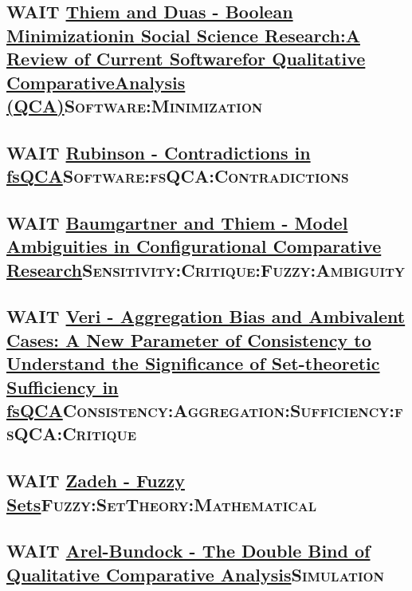 \documentclass[11pt]{article}
\begin{document}
\subsection*{{\bfseries\sffamily WAIT} \href{https://adriandusa.eu/files/2013-BMSSR.pdf}{Thiem and Duas - Boolean Minimizationin Social Science Research:A Review of Current Softwarefor Qualitative ComparativeAnalysis (QCA)}\hfill{}\textsc{Software:Minimization}}
\label{sec:org1ab0787}

\subsection*{{\bfseries\sffamily WAIT} \href{https://sci-hub.tw/https://doi.org/10.1007/s11135-012-9694-3}{Rubinson - Contradictions in fsQCA}\hfill{}\textsc{Software:fsQCA:Contradictions}}
\label{sec:org79c6c22}

\subsection*{{\bfseries\sffamily WAIT} \href{https://doi.org/10.1177\%2F0049124115610351}{Baumgartner and Thiem - Model Ambiguities in Configurational Comparative Research}\hfill{}\textsc{Sensitivity:Critique:Fuzzy:Ambiguity}}
\label{sec:org1ec85d5}

\subsection*{{\bfseries\sffamily WAIT} \href{https://doi.org/10.1163/15691330-12341496}{Veri - Aggregation Bias and Ambivalent Cases: A New Parameter of Consistency to Understand the Significance of Set-theoretic Sufficiency in fsQCA}\hfill{}\textsc{Consistency:Aggregation:Sufficiency:fsQCA:Critique}}
\label{sec:org0d5644f}

\subsection*{{\bfseries\sffamily WAIT} \href{https://doi.org/10.1142/9789814261302\_0021}{Zadeh - Fuzzy Sets}\hfill{}\textsc{Fuzzy:SetTheory:Mathematical}}
\label{sec:org36b3d8c}

\subsection*{{\bfseries\sffamily WAIT} \href{https://doi.org/10.1177\%2F0049124119882460}{Arel-Bundock - The Double Bind of Qualitative Comparative Analysis}\hfill{}\textsc{Simulation}}
\label{sec:orgce92768}
\end{document}
